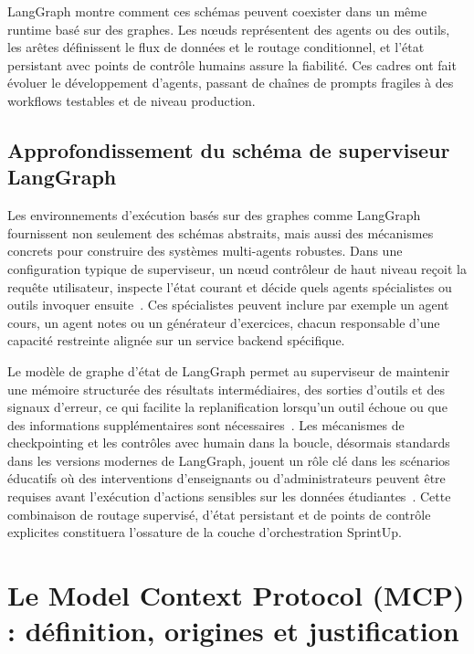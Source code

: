 LangGraph montre comment ces schémas peuvent coexister dans un même runtime basé sur
des graphes. Les nœuds représentent des agents ou des outils, les arêtes définissent
le flux de données et le routage conditionnel, et l'état persistant avec points de
contrôle humains assure la fiabilité. Ces cadres ont fait évoluer le développement
d'agents, passant de chaînes de prompts fragiles à des workflows testables et de
niveau production.

\subsection{Approfondissement du schéma de superviseur LangGraph}

Les environnements d'exécution basés sur des graphes comme LangGraph fournissent non
seulement des schémas abstraits, mais aussi des mécanismes concrets pour construire
des systèmes multi-agents robustes. Dans une configuration typique de superviseur, un
nœud contrôleur de haut niveau reçoit la requête utilisateur, inspecte l'état courant
et décide quels agents spécialistes ou outils invoquer
ensuite~\cite{langgraphsupervisor,langgraphdocs}. Ces spécialistes peuvent inclure par
exemple un agent \og{}cours\fg{}, un agent \og{}notes\fg{} ou un générateur
d'exercices, chacun responsable d'une capacité restreinte alignée sur un service backend
spécifique.

Le modèle de graphe d'état de LangGraph permet au superviseur de maintenir une mémoire
structurée des résultats intermédiaires, des sorties d'outils et des signaux d'erreur,
ce qui facilite la replanification lorsqu'un outil échoue ou que des informations
supplémentaires sont nécessaires~\cite{ibmlanggraph}. Les mécanismes de checkpointing et
les contrôles avec humain dans la boucle, désormais standards dans les versions modernes
de LangGraph, jouent un rôle clé dans les scénarios éducatifs où des interventions
d'enseignants ou d'administrateurs peuvent être requises avant l'exécution d'actions
sensibles sur les données étudiantes~\cite{anthropicagents}. Cette combinaison de
routage supervisé, d'état persistant et de points de contrôle explicites constituera
l'ossature de la couche d'orchestration SprintUp.

\section{Le Model Context Protocol (MCP) : définition, origines et justification}

